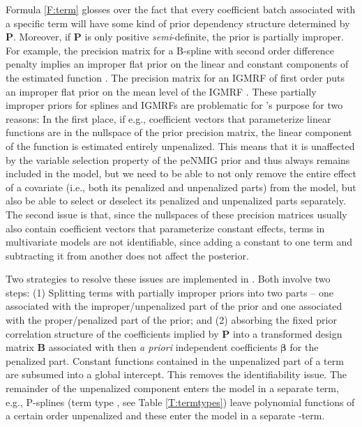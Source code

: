 \documentclass[article, shortnames, nojss, noheadings, notitle]{jss}
\begin{document}
Formula \eqref{F:term} glosses over the fact that every coefficient batch associated with a specific term will
have some kind of prior dependency structure determined by $\bm P$.
Moreover, if $\bm P$ is only positive \emph{semi}-definite, the prior is partially improper. For example,
the precision matrix for a B-spline with second order difference penalty implies an improper flat prior on the
linear and constant components of the estimated function \citep{Lang:Brezger:2004}.
The precision matrix for an IGMRF of first order puts an improper flat prior on the mean level of the IGMRF \citep[][ch. 3]{Rue:Held:2005}.
These partially improper priors for splines and IGMRFs are problematic for 's purpose for two reasons:
In the first place, if e.g., coefficient vectors that parameterize linear functions are in the nullspace of the prior precision matrix,
the linear component of the function is estimated entirely
unpenalized. This means that it is unaffected by the variable selection property of the peNMIG prior and thus always remains
included in the model, but we need to be able to not only remove the entire effect
of a covariate (i.e., both its penalized and unpenalized parts) from the model, but also be able to select or deselect its
penalized and unpenalized parts separately.
The second issue is that, since the nullspaces of these precision matrices usually also contain coefficient vectors that
parameterize constant effects, terms in multivariate models are not identifiable, since adding a constant to one term
and subtracting it from another does not affect the posterior.

Two strategies to resolve these issues are implemented in . Both
involve two steps: (1) Splitting terms with partially improper priors into two parts -- one associated with
the improper/unpenalized part of the prior and one associated with the proper/penalized part of the prior;
and (2) absorbing the fixed prior correlation
structure of the coefficients implied by $\bm P$ into a transformed design matrix $\bm B$ associated with then
\emph{a priori} independent coefficients $\bm\beta$ for the penalized part.
Constant functions contained in the unpenalized part of a term are subsumed into a global intercept.
This removes the identifiability issue.
The remainder of the unpenalized component enters the model in a separate term, e.g.,
P-splines (term type , see Table \ref{T:termtypes}) leave polynomial functions of a certain order
unpenalized and these enter the model in a separate -term.
\end{document}
